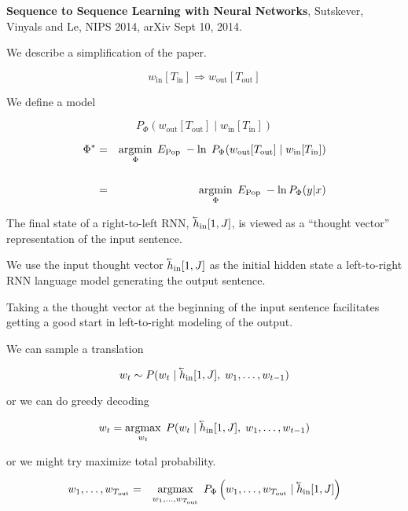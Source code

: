 {\vfill
{\bf Sequence to Sequence Learning with Neural Networks}, Sutskever, Vinyals and Le, NIPS 2014, arXiv Sept 10, 2014.

\vfill
We describe a simplification of the paper.




$$w_{\mathrm{in}}[T_{\mathrm{in}}] \Rightarrow w_{\mathrm{out}}[T_{\mathrm{out}}]$$

\vfill
We define a model

\vfill
$$P_\Phi\left(w_{\mathrm{out}}[T_{\mathrm{out}}]\;|\; w_{\mathrm{in}}[T_\mathrm{in}]\right)$$

\vfill
\begin{eqnarray*}
\Phi^*  & = & \operatorname*{argmin}_\Phi\; E_{\mathrm{Pop}} \;-\ln\;P_\Phi(w_{\mathrm{out}}[T_{\mathrm{out}}] \;|\; w_{\mathrm{in}}[T_{\mathrm{in}}]) \\
\\
& = & \operatorname*{argmin}_\Phi \; E_{\mathrm{Pop}} \; -\ln P_\Phi(y|x)
\end{eqnarray*}



\vfill
The final state of a right-to-left RNN, $\cev{h}_{\mathrm{in}}[1,J]$, is viewed as a ``thought vector'' representation of the input sentence.

\vfill
We use the input thought vector $\cev{h}_{\mathrm{in}}[1,J]$ as the initial hidden state a left-to-right RNN language model
generating the output sentence.

\vfill
Taking a the thought vector at the beginning of the input sentence facilitates getting a good start in left-to-right modeling of the output.


We can sample a translation

$$w_t \sim P(w_t\;|\;\cev{h}_{\mathrm{in}}[1,J],\;w_1,\ldots,w_{t-1})$$

\vfill
or we can do greedy decoding

$$w_t = \argmax_{w_t}\; P(w_t\;|\;\cev{h}_{\mathrm{in}}[1,J],\;w_1,\ldots,w_{t-1})$$

\vfill
or we might try maximize total probability.

\begin{eqnarray*}
w_1,\ldots,w_{T_{\mathrm{out}}}
& = & \argmax_{w_1,\ldots,w_{T_{\mathrm{out}}}} \;P_\Phi\left(w_1,\ldots,w_{T_{\mathrm{out}}} \;|\; \cev{h}_{\mathrm{in}}[1,J]\right)
\end{eqnarray*}

}
